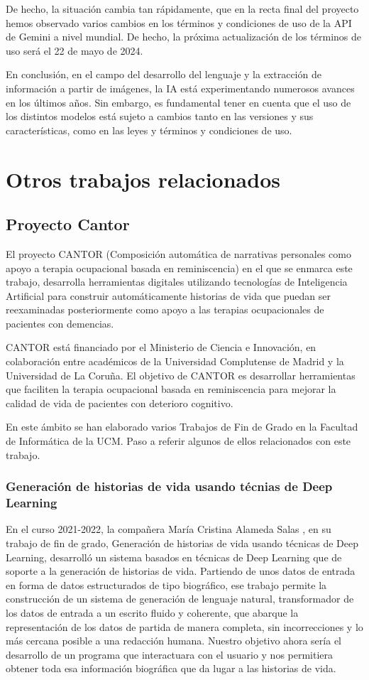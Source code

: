 De hecho, la situación cambia tan rápidamente, que en la recta final del proyecto hemos observado varios cambios en los términos y condiciones de uso de la API de Gemini a nivel mundial. De hecho, la próxima actualización de los términos de uso será el 22 de mayo de 2024.

En conclusión, en el campo del desarrollo del lenguaje y la extracción de información a partir de imágenes, la IA está experimentando numerosos avances en los últimos años. Sin embargo, es fundamental tener en cuenta que el uso de los distintos modelos está sujeto a cambios tanto en las versiones y sus características, como en las leyes y términos y condiciones de uso.

\section{Otros trabajos relacionados}
\label{otrostrabajos}
\subsection{Proyecto Cantor}
El proyecto CANTOR (Composición automática de narrativas personales como apoyo a terapia ocupacional basada en reminiscencia) en el que se enmarca este trabajo, desarrolla herramientas digitales utilizando tecnologías de Inteligencia Artificial para construir automáticamente historias de vida que puedan ser reexaminadas posteriormente como apoyo a las terapias ocupacionales de pacientes con demencias.

CANTOR está financiado por el Ministerio de Ciencia e Innovación, en colaboración entre académicos de la Universidad Complutense de Madrid y la Universidad de La Coruña. El objetivo de CANTOR es desarrollar herramientas que faciliten la terapia ocupacional basada en reminiscencia para mejorar la calidad de vida de pacientes con deterioro cognitivo.

En este ámbito se han elaborado varios Trabajos de Fin de Grado en la Facultad de Informática de la UCM. Paso a referir algunos de ellos relacionados con este trabajo. 

\subsubsection{Generación de historias de vida usando técnias de Deep Learning}
\label{sec:trabajocristina}
En el curso 2021-2022, la compañera María Cristina Alameda Salas \citep{cristinaalameda}, en su trabajo de fin de grado, Generación de historias de vida
usando técnicas de Deep Learning, desarrolló un sistema basados en técnicas
de Deep Learning que de soporte a la generación de historias de vida. Partiendo de unos datos de entrada en forma de datos estructurados de tipo biográfico, ese trabajo permite la construcción de un sistema de generación de lenguaje natural, transformador de los datos de entrada a un escrito fluido y coherente, que abarque la representación de los datos de partida de manera completa, sin incorrecciones y lo más cercana posible a una redacción humana. Nuestro objetivo ahora sería el desarrollo de un programa que interactuara con el usuario y nos permitiera obtener toda esa información biográfica que da lugar a las historias de vida. 
